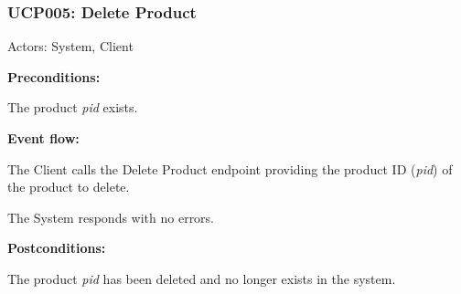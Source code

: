 \begin{ucbox}{\subsubsection{UCP005: Delete Product}}
\label{UCP005}

Actors: System, Client

\textbf{Preconditions:}

\ucitem The product \textit{pid} exists.

\textbf{Event flow:}

\ucitem The Client calls the Delete Product endpoint providing the product ID (\textit{pid}) of the product to delete.

\ucitem The System responds with no errors.

\textbf{Postconditions:}

\ucitem The product \textit{pid} has been deleted and no longer exists in the system.

\end{ucbox}
\newpage